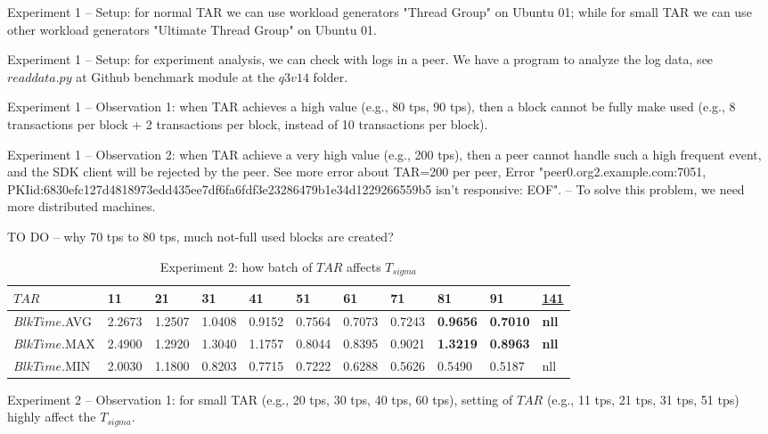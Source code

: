 \documentclass[10pt,journal,compsoc, twoside]{IEEEtran}
\begin{document}
Experiment 1 -- Setup: for normal TAR we can use workload generators "Thread Group" on Ubuntu 01; while for small TAR we can use other workload generators "Ultimate Thread Group" on Ubuntu 01.

Experiment 1 -- Setup: for experiment analysis, we can check with logs in a peer. We have a program to analyze the log data, see $readdata.py$ at Github benchmark module at the $q3 v1 4$ folder.  


Experiment 1 -- Observation 1: when TAR achieves a high value (e.g., 80 tps, 90 tps), then a block cannot be fully make used (e.g., 8 transactions per block + 2 transactions per block, instead of 10 transactions per block).

Experiment 1 -- Observation 2: when TAR achieve a very high value (e.g., 200 tps), then a peer cannot handle such a high frequent event, and the SDK client will be rejected by the peer. See more error about TAR=200 per peer, Error "peer0.org2.example.com:7051, PKIid:6830efc127d4818973edd435ee7df6fa6fdf3e23286479b1e34d1229266559b5 isn't responsive: EOF". -- To solve this problem, we need more distributed machines.

TO DO -- why 70 tps to 80 tps, much not-full used blocks are created?


\begin{table*}[htbp]
	\caption{Experiment 2: how batch of $TAR$ affects $T_{sigma}$}
	\begin{tabular}{|l|l|l|l|l|l|l|l|l|l|l|}
		\hline
		$TAR$           & 11     & 21     & 31     & 41     & 51     & 61     & 71     & 81              & 91              & {\underline{141}}    \\ \hline
		$BlkTime$.AVG & 2.2673 & 1.2507 & 1.0408 & 0.9152 & 0.7564 & 0.7073 & 0.7243 & \textbf{0.9656} & \textbf{0.7010} & \textbf{nll} \\ \hline
		$BlkTime$.MAX & 2.4900 & 1.2920 & 1.3040 & 1.1757 & 0.8044 & 0.8395 & 0.9021 & \textbf{1.3219} & \textbf{0.8963} & \textbf{nll} \\ \hline
		$BlkTime$.MIN & 2.0030 & 1.1800 & 0.8203 & 0.7715 & 0.7222 & 0.6288 & 0.5626 & 0.5490          & 0.5187          & nll          \\ \hline
	\end{tabular}
\end{table*}


Experiment 2 -- Observation 1: for small TAR (e.g., 20 tps, 30 tps, 40 tps, 60 tps), setting of $TAR$ (e.g., 11 tps, 21 tps, 31 tps, 51 tps) highly affect the $T_{sigma}$.
\end{document}
